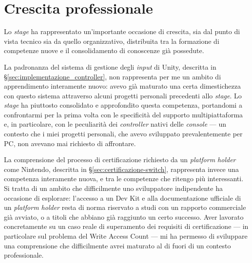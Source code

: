 \section{Crescita professionale}
\label{sec:crescita-professionale}


Lo \textit{stage} ha rappresentato un'importante occasione di crescita, sia dal punto di vista tecnico sia da quello organizzativo, distribuita tra la formazione di competenze nuove e il consolidamento di conoscenze già possedute.
 
La padronanza del sistema di gestione degli \textit{input} di Unity, descritta in \S\ref{sec:implementazione_controller}, non rappresenta per me un ambito di apprendimento interamente nuovo: avevo già maturato una certa dimestichezza con questo sistema attraverso alcuni progetti personali precedenti allo \textit{stage}. Lo \textit{stage} ha piuttosto consolidato e approfondito questa competenza, portandomi a confrontarmi per la prima volta con le specificità del supporto multipiattaforma e, in particolare, con le peculiarità dei \textit{controller} nativi delle \textit{console} — un contesto che i miei progetti personali, che avevo sviluppato prevalentemente per PC, non avevano mai richiesto di affrontare.
 
La comprensione del processo di certificazione richiesto da un \textit{platform holder} come Nintendo, descritta in \S\ref{sec:certificazione-switch}, rappresenta invece una competenza interamente nuova, e tra le competenze che ritengo più interessanti. Si tratta di un ambito che difficilmente uno sviluppatore indipendente ha occasione di esplorare: l'accesso a un Dev Kit e alla documentazione ufficiale di un \textit{platform holder} resta di norma riservato a studi con un rapporto commerciale già avviato, o a titoli che abbiano già raggiunto un certo successo. Aver lavorato concretamente su un caso reale di superamento dei requisiti di certificazione — in particolare sul problema del Write Access Count — mi ha permesso di sviluppare una comprensione che difficilmente avrei maturato al di fuori di un contesto professionale.
 
